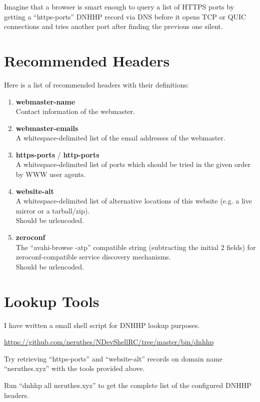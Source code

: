 \documentclass[a4paper,11pt]{article}
\begin{document}
Imagine that a browser is smart enough to query a list of HTTPS ports by getting a ``https-ports'' DNHHP record via DNS
before it opens TCP or QUIC connections and tries another port after finding the previous one silent.






\section{Recommended Headers}

Here is a list of recommended headers with their definitions:

\begin{enumerate}
	\item \textbf{webmaster-name}\\
	      Contact information of the webmaster.
	\item \textbf{webmaster-emails}\\
	      A whitespace-delimited list of the email addresses of the webmaster.
	\item \textbf{https-ports} / \textbf{http-ports}\\
	      A whitespace-delimited list of ports which should be tried in the given order by WWW user agents.
	\item \textbf{website-alt}\\
	      A whitespace-delimited list of alternative locations of this website (e.g. a live mirror or a tarball/zip).
	      \\Should be urlencoded.
	\item \textbf{zeroconf}\\
	      The ``avahi-browse -atp'' compatible string (subtracting the initial 2 fields)
	      for zeroconf-compatible service discovery mechanisms.
	      \\Should be urlencoded.
\end{enumerate}







\section{Lookup Tools}

I have written a small shell script for DNHHP lookup purposes.

\href{https://github.com/neruthes/NDevShellRC/tree/master/bin/dnhhp}{https://github.com/neruthes/NDevShellRC/tree/master/bin/dnhhp}

Try retrieving ``https-ports'' and ``website-alt'' records on domain name ``neruthes.xyz'' with the tools provided above.

Run ``dnhhp all neruthes.xyz'' to get the complete list of the configured DNHHP headers.
\end{document}
